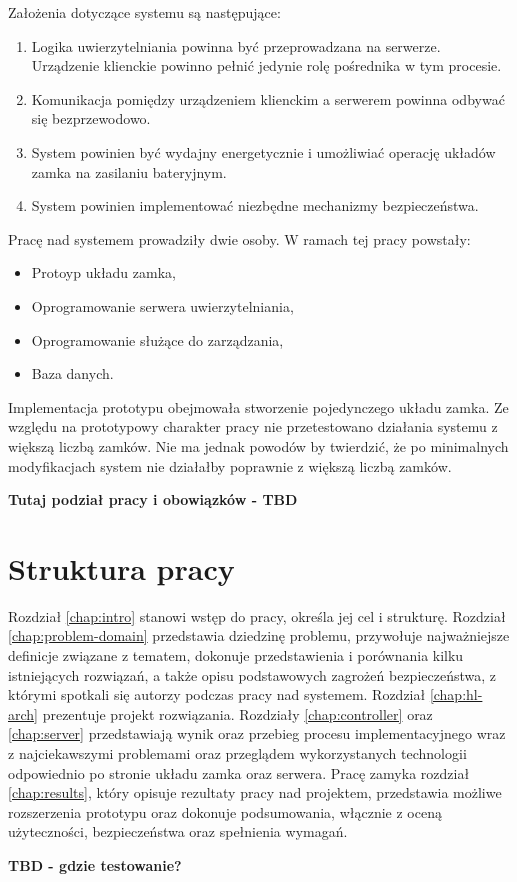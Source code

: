 		Założenia dotyczące systemu są następujące:

		\begin{enumerate}
		    \item Logika uwierzytelniania powinna być przeprowadzana na serwerze. Urządzenie klienckie powinno pełnić jedynie rolę pośrednika w tym procesie.
		    \item Komunikacja pomiędzy urządzeniem klienckim a serwerem powinna odbywać się bezprzewodowo.
		    \item System powinien być wydajny energetycznie i umożliwiać operację układów zamka na zasilaniu bateryjnym.
		    \item System powinien implementować niezbędne mechanizmy bezpieczeństwa.
		\end{enumerate}

		Pracę nad systemem prowadziły dwie osoby. W ramach tej pracy powstały:

		\begin{itemize}
		    \item Protoyp układu zamka,
		    \item Oprogramowanie serwera uwierzytelniania,
		    \item Oprogramowanie służące do zarządzania,
		    \item Baza danych.
		\end{itemize}

		Implementacja prototypu obejmowała stworzenie pojedynczego układu zamka. Ze względu na prototypowy charakter pracy nie przetestowano działania systemu z większą liczbą zamków. Nie ma jednak powodów by twierdzić, że po minimalnych modyfikacjach system nie działałby poprawnie z większą liczbą zamków.

		\textbf{Tutaj podział pracy i obowiązków - TBD}

	\section{Struktura pracy}

		Rozdział \ref{chap:intro} stanowi wstęp do pracy, określa jej cel i strukturę. Rozdział \ref{chap:problem-domain} przedstawia dziedzinę problemu, przywołuje najważniejsze definicje związane z tematem, dokonuje przedstawienia i porównania kilku istniejących rozwiązań, a także opisu podstawowych zagrożeń bezpieczeństwa, z którymi spotkali się autorzy podczas pracy nad systemem. Rozdział \ref{chap:hl-arch} prezentuje projekt rozwiązania. Rozdziały \ref{chap:controller} oraz \ref{chap:server} przedstawiają wynik oraz przebieg procesu implementacyjnego wraz z najciekawszymi problemami oraz przeglądem wykorzystanych technologii odpowiednio po stronie układu zamka oraz serwera. Pracę zamyka rozdział \ref{chap:results}, który opisuje rezultaty pracy nad projektem, przedstawia możliwe rozszerzenia prototypu oraz dokonuje podsumowania, włącznie z oceną użyteczności, bezpieczeństwa oraz spełnienia wymagań.

		\textbf{TBD - gdzie testowanie?}